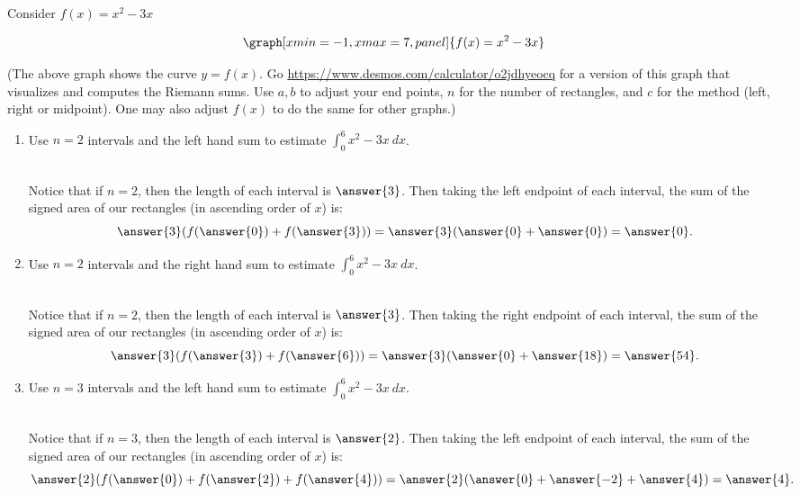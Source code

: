 \documentclass{ximera}
\begin{document}
\begin{question}
Consider $f(x)=x^2-3x$

\begin{onlineOnly}
$$\graph[xmin=-1, xmax=7, panel]{f(x)=x^2-3x}$$
\end{onlineOnly}
(The above graph shows the curve $y=f(x)$. Go  \url{https://www.desmos.com/calculator/o2jdhyeocq} for a version of this graph that visualizes and computes  the Riemann sums.  Use $a, b$ to adjust your end points, $n$ for the number of rectangles, and $c$ for the method (left, right or midpoint).  One may also adjust $f(x)$ to do the same for other graphs.)


\begin{enumerate}
\item Use $n=2$ intervals and the left hand sum to estimate $\displaystyle\int_0^6 x^2-3x\ dx$. \\ \\
\begin{explanation}
Notice that if $n=2$, then the length of each interval is $\answer{3}$.  Then taking the left endpoint of each interval, the sum of the signed area of our rectangles (in ascending order of $x$) is: $$\answer{3}(f(\answer{0})+f(\answer{3}))=\answer{3}(\answer{0}+\answer{0})=\answer{0}.$$
\end{explanation}

\item Use $n=2$ intervals and the right hand sum to estimate $\displaystyle\int_0^6 x^2-3x\ dx$. \\ \\
\begin{explanation}
Notice that if $n=2$, then the length of each interval is $\answer{3}$.  Then taking the right endpoint of each interval, the sum of the signed area of our rectangles (in ascending order of $x$) is: $$\answer{3}(f(\answer{3})+f(\answer{6}))=\answer{3}(\answer{0}+\answer{18})=\answer{54}.$$

\end{explanation}

\item Use $n=3$ intervals and the left hand sum to estimate $\displaystyle\int_0^6 x^2-3x\ dx$. \\ \\
\begin{explanation}
Notice that if $n=3$, then the length of each interval is $\answer{2}$.  Then taking the left endpoint of each interval, the sum of the signed area of our rectangles (in ascending order of $x$) is: $$\answer{2}(f(\answer{0})+f(\answer{2})+f(\answer{4}))=\answer{2}(\answer{0}+\answer{-2}+\answer{4})=\answer{4}.$$


\end{explanation}
\end{enumerate}
\end{question}
\end{document}
